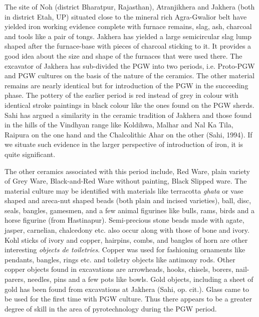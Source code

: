 The site of Noh (district Bharatpur, Rajasthan), Atranjikhera and Jakhera (both in district Etah, UP) situated close to the mineral rich Agra-Gwalior belt have yielded iron working evidence complete with furnace remains, slag, ash, charcoal and tools like a pair of tongs. Jakhera has yielded a large semicircular slag lump shaped after the furnace-base with pieces of charcoal sticking to it. It provides a good idea about the size and shape of the furnaces that were used there. The excavator of Jakhera has sub-divided the PGW into two periods, i.e. Proto-PGW and PGW cultures on the basis of the nature of the ceramics. The other material remains are nearly identical but for introduction of the PGW in the succeeding phase. The pottery of the earlier period is red instead of grey in colour with identical stroke paintings in black colour like the ones found on the PGW sherds. Sahi has argued a similarity in the ceramic tradition of Jakhera and those found in the hills of the Vindhyan range like Koldihwa, Malhar and Nal Ka Tila, Raipura on the one hand and the Chalcolithic Ahar on the other (Sahi, 1994). If we situate such evidence in the larger perspective of introduction of iron, it is quite significant.

The other ceramics associated with this period include, Red Ware, plain variety of Grey Ware, Black-and-Red Ware without painting, Black Slipped ware. The material culture may be identified with materials like terracotta \textit{ghata} or vase shaped and areca-nut shaped beads (both plain and incised varieties), ball, disc, seals, bangles, gamesmen, and a few animal figurines like bulls, rams, birds and a horse figurine (from Hastinapur). Semi-precious stone beads made with agate, jasper, carnelian, chalcedony etc. also occur along with those of bone and ivory. Kohl sticks of ivory and copper, hairpins, combs, and bangles of horn are other interesting \textit{objects de toiletries}. Copper was used for fashioning ornaments like pendants, bangles, rings etc. and toiletry objects like antimony rods. Other copper objects found in excavations are arrowheads, hooks, chisels, borers, nail-parers, needles, pins and a few pots like bowls. Gold objects, including a sheet of gold has been found from excavations at Jakhera (Sahi, op. cit.). Glass came to be used for the first time with PGW culture. Thus there appears to be a greater degree of skill in the area of pyrotechnology during the PGW period.

